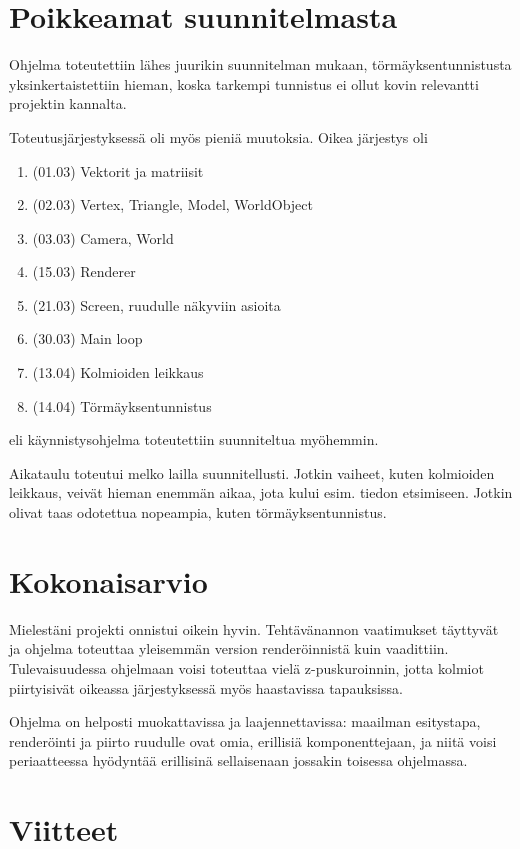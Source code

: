 \documentclass[12pt] {article}
\begin{document}
\section {Poikkeamat suunnitelmasta}

Ohjelma toteutettiin lähes juurikin suunnitelman mukaan, törmäyksentunnistusta yksinkertaistettiin hieman, koska tarkempi tunnistus ei ollut kovin relevantti projektin kannalta.

Toteutusjärjestyksessä oli myös pieniä muutoksia. Oikea järjestys oli

\begin{enumerate}
	\item (01.03) Vektorit ja matriisit
	\item (02.03) Vertex, Triangle, Model, WorldObject
	\item (03.03) Camera, World
	\item (15.03) Renderer
	\item (21.03) Screen, ruudulle näkyviin asioita
	\item (30.03) Main loop
	\item (13.04) Kolmioiden leikkaus
	\item (14.04) Törmäyksentunnistus
\end{enumerate}

eli käynnistysohjelma toteutettiin suunniteltua myöhemmin.

Aikataulu toteutui melko lailla suunnitellusti. Jotkin vaiheet, kuten kolmioiden leikkaus, veivät hieman enemmän aikaa, jota kului esim. tiedon etsimiseen. Jotkin olivat taas odotettua nopeampia, kuten törmäyksentunnistus.

\section {Kokonaisarvio}

Mielestäni projekti onnistui oikein hyvin. Tehtävänannon vaatimukset täyttyvät ja ohjelma toteuttaa yleisemmän version renderöinnistä kuin vaadittiin. Tulevaisuudessa ohjelmaan voisi toteuttaa vielä z-puskuroinnin, jotta kolmiot piirtyisivät oikeassa järjestyksessä myös haastavissa tapauksissa.

Ohjelma on helposti muokattavissa ja laajennettavissa: maailman esitystapa, renderöinti ja piirto ruudulle ovat omia, erillisiä komponenttejaan, ja niitä voisi periaatteessa hyödyntää erillisinä sellaisenaan jossakin toisessa ohjelmassa.



\section {Viitteet}
\end{document}
